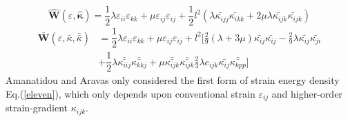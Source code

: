 \documentclass[12pt]{article}
\begin{document}
\begin{equation}
 \hat{\mathbf{W}}(\varepsilon,\hat{\mathbf{\kappa}}) = \dfrac{1}{2}\lambda\varepsilon_{ii}\varepsilon_{kk} + \mu\varepsilon_{ij}\varepsilon_{ij}+\frac{1}{2}l^2(\lambda\tilde{\kappa_{ijj}}\tilde{\kappa_{ikk}}+2\mu\lambda\tilde{\kappa_{ijk}}\tilde{\kappa_{ijk}})
\end{equation}
\begin{equation}
\begin{aligned}
\bar{\mathbf{W}}(\varepsilon,\bar{\kappa},\bar{\bar \kappa}) &= \dfrac{1}{2}\lambda\varepsilon_{ii}\varepsilon_{kk} + \mu\varepsilon_{ij}\varepsilon_{ij} +l^2 [\frac{2}{9}(\lambda+3\mu)\bar{\kappa_{ij}}\bar{\kappa_{ij}}-\frac{2}{9} \lambda \bar{\kappa_{ij}} \bar{\kappa_{ji}} \\
& + \dfrac{1}{2}\lambda \bar{\bar{\kappa_{iij}}} \bar{\bar {\kappa_{kkj}}} + \mu \bar{\bar{ \kappa_{ijk}}} \bar{\bar{ \kappa_{ijk}}} \frac{2}{3}\lambda e_{ijk}\bar{\kappa_{ij}}\bar{\bar {\kappa_{kpp}}}]
\end{aligned}
\end{equation}
\newline
\newline
Amanatidou and Aravas only considered the first form of strain energy density Eq.(\ref{eleven}), which only depends upon conventional strain $ \varepsilon_{ij} $ and higher-order strain-gradient $ \kappa_{ijk} $. 
\newline
\end{document}
